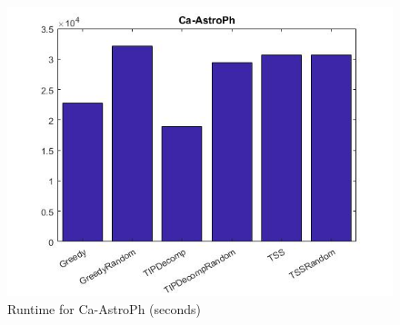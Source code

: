 \begin{figure}
	\centering	
	\includegraphics[scale=0.5]{images/astrophtime.jpg}
	\caption{Runtime for Ca-AstroPh (seconds)}
\end{figure}

